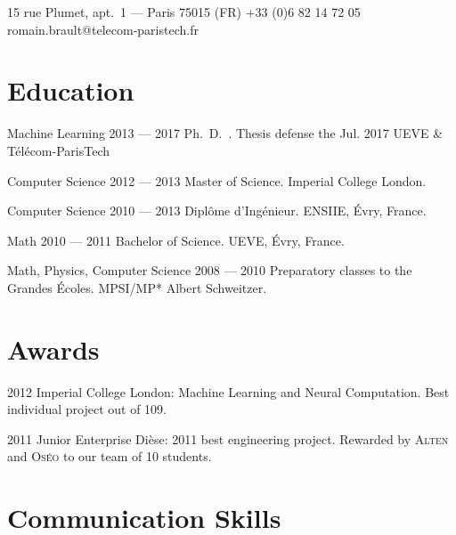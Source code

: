\documentclass{tccv}
\begin{document}
\personal%
    {15 rue Plumet, apt.~1 --- Paris 75015 (FR)}
    {+33 (0)6 82 14 72 05 }
    {romain.brault@telecom-paristech.fr}

\section{Education}

\begin{yearlist}
\item[Machine Learning]{2013 --- 2017}
     {Ph.~D.~. Thesis defense the  Jul. 2017}
     {UEVE \& T\'el\'ecom-ParisTech}

\item[Computer Science]{2012 --- 2013}
     {Master of Science.}
     {Imperial College London.}

\item[Computer Science]{2010 --- 2013}
     {Dipl\^ome d'Ing\'enieur.}
     {ENSIIE, \'Evry, France.}

\item[Math]{2010 --- 2011}
     {Bachelor of Science.}
     {UEVE, \'Evry, France.}

\item[Math, Physics, Computer Science]{2008 --- 2010}
     {Preparatory classes to the Grandes \'Ecoles.}
     {MPSI/MP* Albert Schweitzer.}

\end{yearlist}


\section{Awards}

\begin{yearlist}

\item{2012}
     {Imperial College London: Machine Learning and Neural Computation.}
     {Best individual project out of 109.}

\item{2011}
     {Junior Enterprise Di\`ese: 2011 best engineering project.}
     {Rewarded by \textsc{Alten} and \textsc{Os\'eo} to our team of 10
     students.}

\end{yearlist}

\section{Communication Skills}
\end{document}
